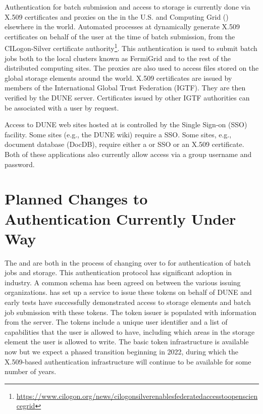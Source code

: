 \documentclass[../main-v1.tex]{subfiles}
\begin{document}
Authentication for batch submission and access to storage is currently done via X.509 certificates and proxies
on the %
 in the U.S. and  %
Computing Grid () elsewhere in the world.  %
Automated processes %
at  %
dynamically generate 
X.509 certificates on behalf of the user at the time of batch submission, from the CILogon-Silver 
certificate authority\footnote{\url{https://www.cilogon.org/news/cilogonsilverenablesfederatedaccesstoopensciencegrid}}. This authentication is used to submit batch jobs both to the local
 clusters known as FermiGrid and to the rest of the distributed computing sites.  The proxies are
also used to access files %
stored on the global storage elements around the world.  
X.509 certificates are issued by members of the International Global Trust Federation (IGTF).  They are then verified 
by the DUNE  server.  Certificates issued by other IGTF authorities can be associated with a user by request.

Access to DUNE web sites hosted at  is controlled by the  Single Sign-on (SSO) facility.  Some sites (e.g., the DUNE wiki) %
require a  SSO.
 Some sites, e.g., %
document database (DocDB), require either a  or  SSO or  %
an X.509 certificate. %
Both of these applications also currently allow access via a group username and password.


\section{Planned Changes to Authentication Currently Under Way}

The  and  are both in the process of changing over to  %
for authentication of batch jobs and storage. This %
authentication protocol %
has significant adoption in industry. A common schema has been agreed on between the various issuing organizations. %
 has set up a %
service to issue these tokens on behalf of DUNE and early tests have %
successfully demonstrated access to storage elements and batch job submission with these tokens. %
The token issuer is populated with information from the  server. %
The tokens include a unique user identifier %
and a list of capabilities that the user is allowed to have, including which 
areas in the storage element the user is allowed to write.  The basic token infrastructure is available now but we expect a phased transition beginning in 2022, during which %
the X.509-based authentication infrastructure will continue to be available for some number of years.
\end{document}

